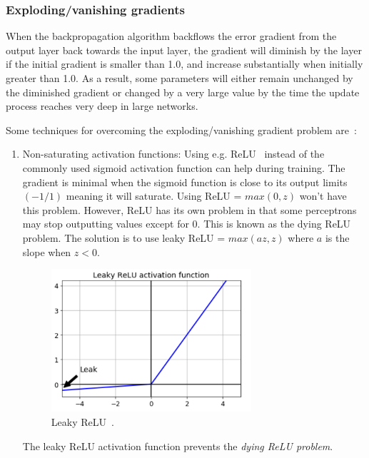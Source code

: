 \documentclass[english, bibtex]{kththesis}
\begin{document}
\subsubsection{Exploding/vanishing gradients}
When the backpropagation algorithm backflows the error gradient from the output layer back towards the input layer, the gradient will diminish by the layer if the initial gradient is smaller than 1.0, and increase substantially when initially greater than 1.0. As a result, some parameters will either remain unchanged by the diminished gradient or changed by a very large value by the time the update process reaches very deep in large networks.

Some techniques for overcoming the exploding/vanishing gradient problem are~\cite{doi:10.1142/S0218488598000094}:

\begin{enumerate}
\item Non-saturating activation functions: Using e.g. ReLU~\cite{maas2013rectifier} instead of the commonly used sigmoid activation function can help during training. The gradient is minimal when the sigmoid function is close to its output limits $(-1/1)$ meaning it will saturate. Using ReLU = $max(0,z)$ won't have this problem. However, ReLU has its own problem in that some perceptrons may stop outputting values except for 0. This is known as the dying ReLU problem. The solution is to use leaky ReLU = $max(az,z)$ where $a$ is the slope when $z < 0$. 

\begin{figure}[H]
  \begin{center}
    \includegraphics[width=0.7\textwidth]{figures/leaky_relu.png}
  \end{center}
  \caption{Leaky ReLU~\cite{Wang_2019}.}
  \label{fig:leaky_relu}
\end{figure}

\begin{center} 
The leaky ReLU activation function prevents the \textit{dying ReLU problem}.
\end{center}


\end{enumerate}
\end{document}
